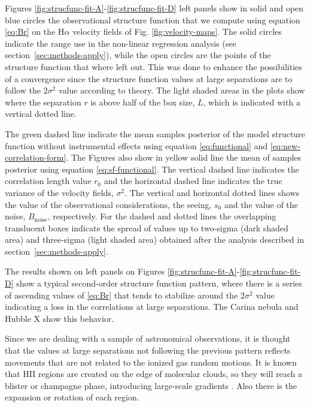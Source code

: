 \documentclass[fleqn,usenatbib, useAMS, a4paper]{mnras}
\newcommand\ha{\ensuremath{\text{H}\alpha}}
\begin{document}
Figures \ref{fig:strucfunc-fit-A}-\ref{fig:strucfunc-fit-D} left panels show in solid and open blue circles the observational structure function that we compute using equation \ref{eq:Br} on the \ha{} velocity fields of Fig. \ref{fig:velocity-maps}. The solid circles indicate the range use in the non-linear regression analysis (see section~\ref{sec:methods-apply}), while the open circles are the points of the structure function that where left out.
This was done to enhance the possibilities of a convergence since the structure function values at large separations are to follow the 2\(\sigma^2\) value according to theory.
The light shaded areas in the plots show where the separation \(r\) is above half of the box size, \(L\), which is indicated with a vertical dotted line.

The green dashed line indicate the mean samples posterior of the model structure function without instrumental effects using equation \ref{eq:functional} and \ref{eq:new-correlation-form}.
The Figures also show in yellow solid line the mean of samples posterior using equation \ref{eq:sf-functional}.
The vertical dashed line indicates the correlation length value \(r_0\) and the horizontal dashed line indicates the true variance of the velocity fields, \(\sigma^2\).
The vertical and horizontal dotted lines shows the value of the observational considerations, the seeing, \(s_0\) and the value of the noise, \(B_{\text{noise}}\), respectively.
For the dashed and dotted lines the overlapping translucent boxes indicate the spread of values up to two-sigma (dark shaded area) and three-sigma (light shaded area) obtained after the analysis described in section~\ref{sec:methods-apply}.

The results shown on left panels on Figures \ref{fig:strucfunc-fit-A}-\ref{fig:strucfunc-fit-D} show a typical second-order structure function pattern, where there is a series of ascending values of  \ref{eq:Br} that tends to stabilize around the 2\(\sigma^2\) value indicating a loss in the correlations at large separations. 
The Carina nebula and Hubble X show this behavior.

Since we are dealing with a sample of astronomical observations, it is thought that the values at large separations not following the previous pattern reflects movements that are not related to the ionized gas random motions.
It is known that HII regions are created on the edge of molecular clouds, so they will reach a blister or champagne phase, introducing large-scale gradients \citep{Mivi1995}. 
Also there is the expansion or rotation of each region.
\end{document}
